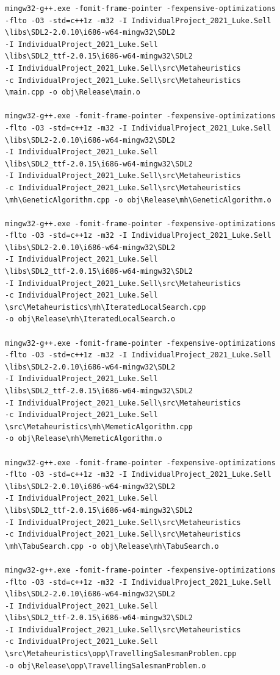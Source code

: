 \documentclass[]{final_report}
\begin{document}
\begin{verbatim}
mingw32-g++.exe -fomit-frame-pointer -fexpensive-optimizations
-flto -O3 -std=c++1z -m32 -I IndividualProject_2021_Luke.Sell
\libs\SDL2-2.0.10\i686-w64-mingw32\SDL2
-I IndividualProject_2021_Luke.Sell
\libs\SDL2_ttf-2.0.15\i686-w64-mingw32\SDL2
-I IndividualProject_2021_Luke.Sell\src\Metaheuristics
-c IndividualProject_2021_Luke.Sell\src\Metaheuristics
\main.cpp -o obj\Release\main.o

mingw32-g++.exe -fomit-frame-pointer -fexpensive-optimizations
-flto -O3 -std=c++1z -m32 -I IndividualProject_2021_Luke.Sell
\libs\SDL2-2.0.10\i686-w64-mingw32\SDL2
-I IndividualProject_2021_Luke.Sell
\libs\SDL2_ttf-2.0.15\i686-w64-mingw32\SDL2
-I IndividualProject_2021_Luke.Sell\src\Metaheuristics
-c IndividualProject_2021_Luke.Sell\src\Metaheuristics
\mh\GeneticAlgorithm.cpp -o obj\Release\mh\GeneticAlgorithm.o

mingw32-g++.exe -fomit-frame-pointer -fexpensive-optimizations
-flto -O3 -std=c++1z -m32 -I IndividualProject_2021_Luke.Sell
\libs\SDL2-2.0.10\i686-w64-mingw32\SDL2
-I IndividualProject_2021_Luke.Sell
\libs\SDL2_ttf-2.0.15\i686-w64-mingw32\SDL2
-I IndividualProject_2021_Luke.Sell\src\Metaheuristics
-c IndividualProject_2021_Luke.Sell
\src\Metaheuristics\mh\IteratedLocalSearch.cpp
-o obj\Release\mh\IteratedLocalSearch.o

mingw32-g++.exe -fomit-frame-pointer -fexpensive-optimizations
-flto -O3 -std=c++1z -m32 -I IndividualProject_2021_Luke.Sell
\libs\SDL2-2.0.10\i686-w64-mingw32\SDL2
-I IndividualProject_2021_Luke.Sell
\libs\SDL2_ttf-2.0.15\i686-w64-mingw32\SDL2
-I IndividualProject_2021_Luke.Sell\src\Metaheuristics
-c IndividualProject_2021_Luke.Sell
\src\Metaheuristics\mh\MemeticAlgorithm.cpp
-o obj\Release\mh\MemeticAlgorithm.o

mingw32-g++.exe -fomit-frame-pointer -fexpensive-optimizations
-flto -O3 -std=c++1z -m32 -I IndividualProject_2021_Luke.Sell
\libs\SDL2-2.0.10\i686-w64-mingw32\SDL2
-I IndividualProject_2021_Luke.Sell
\libs\SDL2_ttf-2.0.15\i686-w64-mingw32\SDL2
-I IndividualProject_2021_Luke.Sell\src\Metaheuristics
-c IndividualProject_2021_Luke.Sell\src\Metaheuristics
\mh\TabuSearch.cpp -o obj\Release\mh\TabuSearch.o

mingw32-g++.exe -fomit-frame-pointer -fexpensive-optimizations
-flto -O3 -std=c++1z -m32 -I IndividualProject_2021_Luke.Sell
\libs\SDL2-2.0.10\i686-w64-mingw32\SDL2
-I IndividualProject_2021_Luke.Sell
\libs\SDL2_ttf-2.0.15\i686-w64-mingw32\SDL2
-I IndividualProject_2021_Luke.Sell\src\Metaheuristics
-c IndividualProject_2021_Luke.Sell
\src\Metaheuristics\opp\TravellingSalesmanProblem.cpp
-o obj\Release\opp\TravellingSalesmanProblem.o


\end{verbatim}
\end{document}
